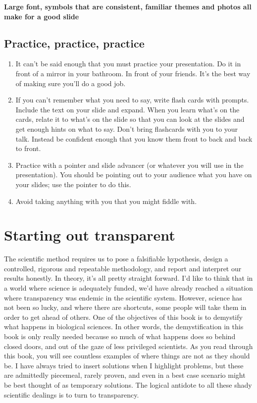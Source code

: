 \documentclass[
]{krantz}
\providecommand{\tightlist}{%
  \setlength{\itemsep}{0pt}\setlength{\parskip}{0pt}}
\begin{document}
\textbf{Large font, symbols that are consistent, familiar themes and photos all make for a good slide}

\hypertarget{practice-practice-practice}{%
\subsection{Practice, practice, practice}\label{practice-practice-practice}}

\begin{enumerate}
\def\labelenumi{\arabic{enumi}.}
\tightlist
\item
  It can't be said enough that you must practice your presentation. Do it in front of a mirror in your bathroom. In front of your friends. It's the best way of making sure you'll do a good job.
\item
  If you can't remember what you need to say, write flash cards with prompts. Include the text on your slide and expand. When you learn what's on the cards, relate it to what's on the slide so that you can look at the slides and get enough hints on what to say. Don't bring flashcards with you to your talk. Instead be confident enough that you know them front to back and back to front.
\item
  Practice with a pointer and slide advancer (or whatever you will use in the presentation). You should be pointing out to your audience what you have on your slides; use the pointer to do this.
\item
  Avoid taking anything with you that you might fiddle with.
\end{enumerate}

\hypertarget{transparency}{%
\section{Starting out transparent}\label{transparency}}

The scientific method requires us to pose a falsifiable hypothesis, design a controlled, rigorous and repeatable methodology, and report and interpret our results honestly. In theory, it's all pretty straight forward. I'd like to think that in a world where science is adequately funded, we'd have already reached a situation where transparency was endemic in the scientific system. However, science has not been so lucky, and where there are shortcuts, some people will take them in order to get ahead of others. One of the objectives of this book is to demystify what happens in biological sciences. In other words, the demystification in this book is only really needed because so much of what happens does so behind closed doors, and out of the gaze of less privileged scientists. As you read through this book, you will see countless examples of where things are not as they should be. I have always tried to insert solutions when I highlight problems, but these are admittedly piecemeal, rarely proven, and even in a best case scenario might be best thought of as temporary solutions. The logical antidote to all these shady scientific dealings is to turn to transparency.
\end{document}
